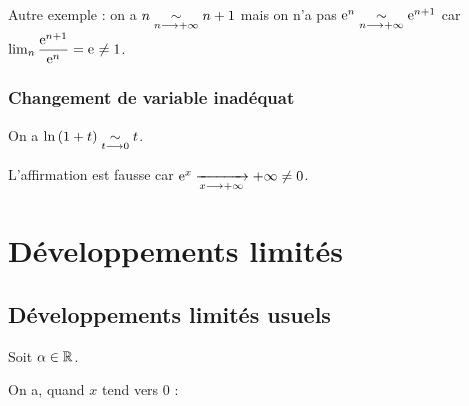 Autre exemple : on a \(n\underset{n\longrightarrow+\infty}{\sim}n+1\) mais on n'a pas \(\mathrm{e}^{n}\underset{n\longrightarrow+\infty}{\sim}\mathrm{e}^{n+1}\) car \(\lim_n\dfrac{\mathrm{e}^{n+1}}{\mathrm{e}^{n}}=\mathrm{e}^{}\not=1\).

\subsubsection{Changement de variable inadéquat}

On a \(\ln\left(1+t\right)\underset{t\longrightarrow0}{\sim}t\).

L'affirmation  est fausse car \(\mathrm{e}^{x}\xrightarrow[x\longrightarrow+\infty]{}+\infty\not=0\).

\section{Développements limités}

\subsection*{Développements limités usuels}\label{subsec:développementsLimitésUsuels}

Soit \(\alpha\in\mathbb{R}\).

On a, quand \(x\) tend vers \(0\) :

